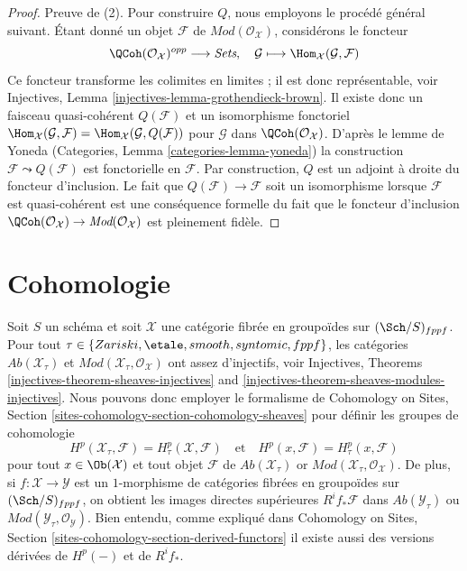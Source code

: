 \begin{proof}
\medskip\noindent
Preuve de (2). Pour construire $Q$, nous employons le procédé général suivant.
Étant donné un objet $\mathcal{F}$ de $\textit{Mod}(\mathcal{O}_\mathcal{X})$,
considérons le foncteur
$$
\QCoh(\mathcal{O}_\mathcal{X})^{opp}
\longrightarrow
\textit{Sets},
\quad
\mathcal{G}
\longmapsto
\Hom_\mathcal{X}(\mathcal{G}, \mathcal{F})
$$
Ce foncteur transforme les colimites en limites ;
il est donc représentable, voir
Injectives, Lemma \ref{injectives-lemma-grothendieck-brown}.
Il existe donc un faisceau quasi-cohérent $Q(\mathcal{F})$
et un isomorphisme fonctoriel
$\Hom_\mathcal{X}(\mathcal{G}, \mathcal{F}) =
\Hom_\mathcal{X}(\mathcal{G}, Q(\mathcal{F}))$
pour $\mathcal{G}$ dans $\QCoh(\mathcal{O}_\mathcal{X})$.
D'après le lemme de Yoneda
(Categories, Lemma \ref{categories-lemma-yoneda})
la construction $\mathcal{F} \leadsto Q(\mathcal{F})$ est
fonctorielle en $\mathcal{F}$. Par construction, $Q$ est un adjoint
à droite du foncteur d'inclusion.
Le fait que $Q(\mathcal{F}) \to \mathcal{F}$ soit un isomorphisme
lorsque $\mathcal{F}$ est quasi-cohérent est une conséquence formelle du fait
que le foncteur d'inclusion
$\QCoh(\mathcal{O}_\mathcal{X}) \to
\textit{Mod}(\mathcal{O}_\mathcal{X})$
est pleinement fidèle.
\end{proof}








\section{Cohomologie}
\label{section-cohomology-general}

\noindent
Soit $S$ un schéma et soit $\mathcal{X}$ une catégorie fibrée en groupoïdes
sur $(\Sch/S)_{fppf}$. Pour tout $\tau \in \{Zariski, \etale, smooth,
syntomic, fppf\}$, les catégories $\textit{Ab}(\mathcal{X}_\tau)$ et
$\textit{Mod}(\mathcal{X}_\tau, \mathcal{O}_\mathcal{X})$ ont
assez d'injectifs, voir
Injectives, Theorems \ref{injectives-theorem-sheaves-injectives} and
\ref{injectives-theorem-sheaves-modules-injectives}.
Nous pouvons donc employer le formalisme de
Cohomology on Sites, Section \ref{sites-cohomology-section-cohomology-sheaves}
pour définir les groupes de cohomologie
$$
H^p(\mathcal{X}_\tau, \mathcal{F}) = H^p_\tau(\mathcal{X}, \mathcal{F})
\quad\text{et}\quad
H^p(x, \mathcal{F}) = H^p_\tau(x, \mathcal{F})
$$
pour tout $x \in \Ob(\mathcal{X})$ et tout objet $\mathcal{F}$ de
$\textit{Ab}(\mathcal{X}_\tau)$ or
$\textit{Mod}(\mathcal{X}_\tau, \mathcal{O}_\mathcal{X})$. De plus, si
$f : \mathcal{X} \to \mathcal{Y}$ est un $1$-morphisme de catégories fibrées
en groupoïdes sur $(\Sch/S)_{fppf}$, on obtient les images directes
supérieures $R^if_*\mathcal{F}$ dans $\textit{Ab}(\mathcal{Y}_\tau)$ ou
$\textit{Mod}(\mathcal{Y}_\tau, \mathcal{O}_\mathcal{Y})$.
Bien entendu, comme expliqué dans
Cohomology on Sites, Section \ref{sites-cohomology-section-derived-functors}
il existe aussi des versions dérivées de $H^p(-)$ et de $R^if_*$.

